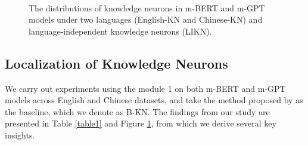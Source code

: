 \documentclass[]{article}
\begin{document}
\begin{figure}
   \centering
   \\
   \caption{The distributions of knowledge neurons in m-BERT and m-GPT models under two languages (English-KN and Chinese-KN) and language-independent knowledge neurons (LIKN).}
   \label{fig3}
\end{figure}

\subsection{Localization of Knowledge Neurons}
We carry out experiments using the module 1 on both m-BERT and m-GPT models across English and Chinese datasets, and take the method proposed by \citeauthor{dai2022kn} as the baseline, which we denote as B-KN.
The findings from our study are presented in Table \ref{table1} and Figure \ref{fig3}, from which we derive several key insights.
\end{document}

